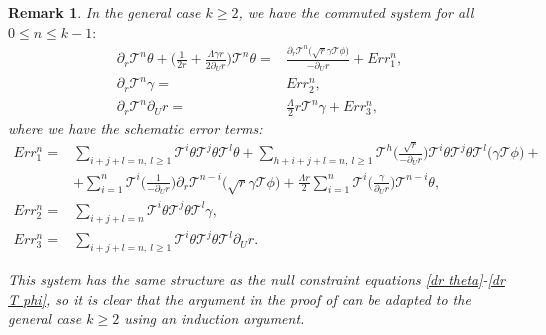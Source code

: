 \documentclass[11pt]{article}
\newtheorem{remark}{Remark}[section]
\numberwithin{equation}{section}
\begin{document}
\begin{remark}\label{remark on general k}
    In the general case $k\geq2$, we have the commuted system for all $0\leq n\leq k-1:$
\begin{align}
    \partial_r\mathcal{T}^n\theta+\bigg(\frac{1}{2r}+\frac{\Lambda\gamma r}{2\partial_Ur}\bigg)\mathcal{T}^n\theta=&\frac{\partial_r\mathcal{T}^n\big(\sqrt{r}\gamma\mathcal{T}\phi\big)}{-\partial_Ur}+Err_1^n, \\
    \partial_r\mathcal{T}^n\gamma=& Err_2^n,\\
    \partial_r\mathcal{T}^n\partial_Ur=& \frac{\Lambda}{2}r\mathcal{T}^n\gamma+Err_3^n,
\end{align}
where we have the schematic error terms:
\begin{align*}
    Err_1^n=&\sum_{i+j+l=n,\ l\geq 1}\mathcal{T}^i\theta\mathcal{T}^j\theta\mathcal{T}^l\theta+\sum_{h+i+j+l=n,\ l\geq 1}\mathcal{T}^h\bigg(\frac{\sqrt{r}}{-\partial_Ur}\bigg)\mathcal{T}^i\theta\mathcal{T}^j\theta\mathcal{T}^l\big(\gamma\mathcal{T}\phi\big)+ \\
    &+\sum_{i=1}^n\mathcal{T}^i\bigg(\frac{1}{-\partial_Ur}\bigg)\partial_r\mathcal{T}^{n-i}\big(\sqrt{r}\gamma\mathcal{T}\phi\big)+\frac{\Lambda r}{2}\sum_{i=1}^n\mathcal{T}^i\bigg(\frac{\gamma}{\partial_Ur}\bigg)\mathcal{T}^{n-i}\theta,\\
    Err_2^n=& \sum_{i+j+l=n}\mathcal{T}^i\theta\mathcal{T}^j\theta\mathcal{T}^l\gamma,\\
    Err_3^n=&\sum_{i+j+l=n,\ l\geq 1}\mathcal{T}^i\theta\mathcal{T}^j\theta\mathcal{T}^l\partial_Ur.
\end{align*}

This system has the same structure as the null constraint equations \eqref{dr theta}-\eqref{dr T phi}, so it is clear that the argument in the proof of  can be adapted to the general case $k\geq2$ using an induction argument.
\end{remark}



\end{document}
